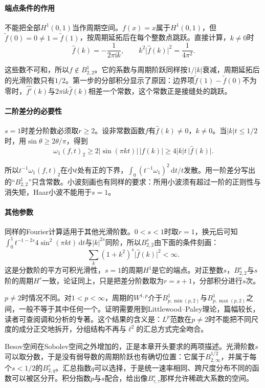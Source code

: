 \paragraph{端点条件的作用}
不能把全部$H^1(0,1)$当作周期空间。$f(x)=x$属于$H^1(0,1)$，但$\tilde f(0)=0\neq1=\tilde f(1)$，按周期延拓后在每个整数点跳跃。直接计算，$k\neq0$时
\[
 \widehat f(k)=-\frac{1}{2\pi\mathrm ik},\qquad k^2\lvert\widehat f(k)\rvert^2=\frac{1}{4\pi^2} .
\]

这些数不可和，所以$f\notin B^1_{2,2}$。它的系数与周期阶跃同样按$1/\lvert k\rvert$衰减，周期延拓后的光滑阶数只有$1/2$。第一步的分部积分显示了原因：边界项$\tilde f(1)-\tilde f(0)$不为零时，$\widehat{f'}(k)$与$2\pi\mathrm ik\widehat f(k)$相差一个常数，这个常数正是接缝处的跳跃。

\paragraph{二阶差分的必要性}
$s=1$时差分阶数必须取$r\geq2$。设非常数函数$f$有$\widehat f(k)\neq0$，$k\neq0$。当$\lvert k\rvert t\leq1/2$时，用$\sin\theta\geq2\theta/\pi$，得到
\[
 \omega_1(f,t)_2\geq2\lvert\sin(\pi kt)\rvert\,\lvert\widehat f(k)\rvert\geq4\lvert k\rvert t\,\lvert\widehat f(k)\rvert .
\]

所以$t^{-1}\omega_1(f,t)_2$在小$t$处有正的下界，$\int_0(t^{-1}\omega_1)^2\,\mathrm dt/t$发散。用一阶差分写出的“$B^1_{2,2}$”只含常数。小波刻画也有同样的要求：所用小波须有超过一阶的正则性与消失矩，Haar小波不能用于$s=1$。

\paragraph{其他参数}
同样的Fourier计算适用于其他光滑阶数。$0<s<1$时取$r=1$，换元后可知$\int_0^1t^{-1-2s}4\sin^2(\pi kt)\,\mathrm dt$与$\lvert k\rvert^{2s}$同阶，所以$B^s_{2,2}$由下面的条件刻画：
\[
 \sum_k(1+k^2)^s\lvert\widehat f(k)\rvert^2<\infty .
\]
这是分数阶的平方可积光滑性，$s=1$的周期$H^1$是它的端点。对正整数$s$，$B^s_{2,2}$与$s$阶的周期$H^s$一致，论证同上，只是把差分阶数取为$r=s+1$，分部积分进行$s$次。

$p\neq2$时情况不同。对$1<p<\infty$，周期的$W^{1,p}$介于$B^1_{p,\min(p,2)}$与$B^1_{p,\max(p,2)}$之间，一般不等于其中任何一个。证明需要用到Littlewood--Paley理论，篇幅较长，读者可查阅调和分析的专著。这个结果的含义是：$L^p$范数在$p\neq2$时不能把不同尺度的成分正交地拆开，分组结构不再与$\ell^2$的汇总方式完全吻合。

Besov空间在Sobolev空间之外增加的，正是本章开头要求的两项描述。光滑阶数$s$可以取分数，于是没有弱导数的周期阶跃也有确切位置：它属于$B^{1/2}_{2,\infty}$，并属于每个$s<1/2$的$B^s_{2,q}$。汇总指数$q$可以选择，于是统一速率相同、跨尺度分布不同的函数可以被区分开。积分指数$p$与$s$配合，给出像$B^s_{\tau,\tau}$那样允许稀疏大系数的空间。
